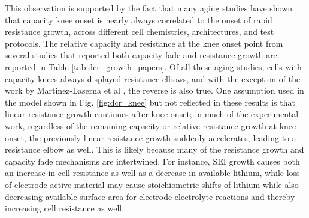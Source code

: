 \documentclass[journal=jpclcd,manuscript=article]{achemso}
\begin{document}
This observation is supported by the fact that many aging studies have shown that capacity knee onset is nearly always correlated to the onset of rapid resistance growth, across different cell chemistries, architectures, and test protocols. The relative capacity and resistance at the knee onset point from several studies that reported both capacity fade and resistance growth are reported in Table \ref{tab:dcr_growth_papers}. Of all these aging studies, cells with capacity knees always displayed resistance elbows, and with the exception of the work by Martinez-Laserna et al \cite{martinez-laserna_technical_2018}, the reverse is also true. One assumption used in the model shown in Fig. \ref{fig:dcr_knee} but not reflected in these results is that linear resistance growth continues after knee onset; in much of the experimental work, regardless of the remaining capacity or relative resistance growth at knee onset, the previously linear resistance growth suddenly accelerates, leading to a resistance elbow as well. This is likely because many of the resistance growth and capacity fade mechanisms are intertwined. For instance, SEI growth causes both an increase in cell resistance as well as a decrease in available lithium, while loss of electrode active material may cause stoichiometric shifts of lithium while also decreasing available surface area for electrode-electrolyte reactions and thereby increasing cell resistance as well.
\end{document}
